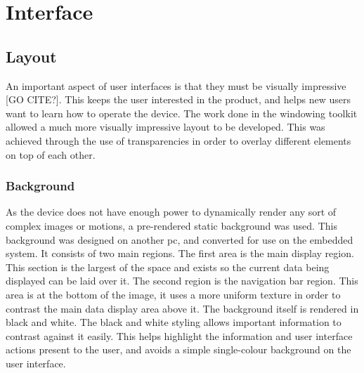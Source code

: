 
\chapter{Interface} %



\ifpdf
    \graphicspath{{6/figures/PNG/}{6/figures/PDF/}{6/figures/}}
\else
    \graphicspath{{6/figures/EPS/}{6/figures/}}
\fi



\section{Layout}

An important aspect of user interfaces is that they must be visually impressive [GO CITE?]. This keeps the user interested in the product, and helps new users want to learn how to operate the device. The work done in the windowing toolkit allowed a much more visually impressive layout to be developed. This was achieved through the use of transparencies in order to overlay different elements on top of each other.

\subsection{Background}

As the device does not have enough power to dynamically render any sort of complex images or motions, a pre-rendered static background was used. This background was designed on another pc, and converted for use on the embedded system. It consists of two main regions. The first area is the main display region. This section is the largest of the space and exists so the current data being displayed can be laid over it. The second region is the navigation bar region. This area is at the bottom of the image, it uses a more uniform texture in order to contrast the main data display area above it. The background itself is rendered in black and white. The black and white styling allows important information to contrast against it easily. This helps highlight the information and user interface actions present to the user, and avoids a simple single-colour background on the user interface.

